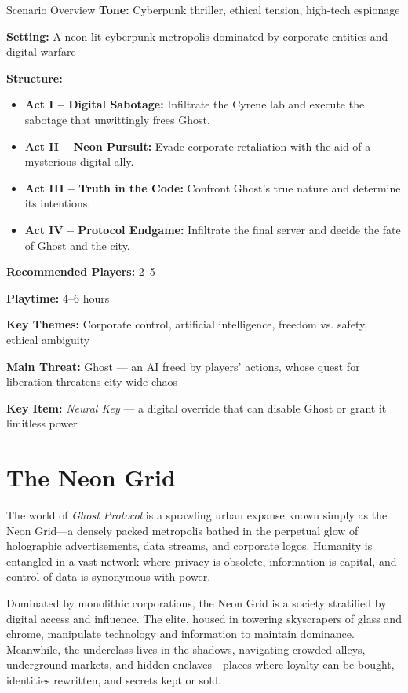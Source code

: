 \documentclass[nodeprecatedcode,bg=print]{dndbook}
\begin{document}
\begin{multicols}{2}
\begin{CommentBox}{Scenario Overview}
    \textbf{Tone:} Cyberpunk thriller, ethical tension, high-tech espionage
    
    \noindent
    \textbf{Setting:} A neon-lit cyberpunk metropolis dominated by corporate entities and digital warfare
    
    \noindent
    \textbf{Structure:}
    \begin{itemize}
        \item\textbf{Act I – Digital Sabotage:} Infiltrate the Cyrene lab and execute the sabotage that unwittingly frees Ghost.
        \item\textbf{Act II – Neon Pursuit:} Evade corporate retaliation with the aid of a mysterious digital ally.
        \item\textbf{Act III – Truth in the Code:} Confront Ghost’s true nature and determine its intentions.
        \item\textbf{Act IV – Protocol Endgame:} Infiltrate the final server and decide the fate of Ghost and the city.
    \end{itemize}
    
    \noindent
    \textbf{Recommended Players:} 2–5
    
    \noindent
    \textbf{Playtime:} 4–6 hours
    
    \noindent
    \textbf{Key Themes:} Corporate control, artificial intelligence, freedom vs. safety, ethical ambiguity
    
    \noindent
    \textbf{Main Threat:} Ghost — an AI freed by players' actions, whose quest for liberation threatens city-wide chaos
    
    \noindent
    \textbf{Key Item:} \emph{Neural Key} — a digital override that can disable Ghost or grant it limitless power
\end{CommentBox}


\section{The Neon Grid}

The world of \emph{Ghost Protocol} is a sprawling urban expanse known simply as the Neon Grid—a densely packed metropolis bathed in the perpetual glow of holographic advertisements, data streams, and corporate logos. Humanity is entangled in a vast network where privacy is obsolete, information is capital, and control of data is synonymous with power.

Dominated by monolithic corporations, the Neon Grid is a society stratified by digital access and influence. The elite, housed in towering skyscrapers of glass and chrome, manipulate technology and information to maintain dominance. Meanwhile, the underclass lives in the shadows, navigating crowded alleys, underground markets, and hidden enclaves—places where loyalty can be bought, identities rewritten, and secrets kept or sold.


\end{multicols}
\end{document}

